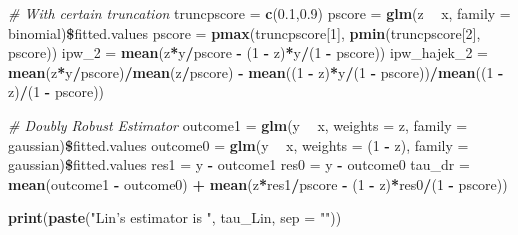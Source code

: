\documentclass[]{article}
\newenvironment{Shaded}{\begin{snugshade}}{\end{snugshade}}
\newcommand{\KeywordTok}[1]{\textcolor[rgb]{0.13,0.29,0.53}{\textbf{#1}}}
\newcommand{\DataTypeTok}[1]{\textcolor[rgb]{0.13,0.29,0.53}{#1}}
\newcommand{\DecValTok}[1]{\textcolor[rgb]{0.00,0.00,0.81}{#1}}
\newcommand{\FloatTok}[1]{\textcolor[rgb]{0.00,0.00,0.81}{#1}}
\newcommand{\StringTok}[1]{\textcolor[rgb]{0.31,0.60,0.02}{#1}}
\newcommand{\CommentTok}[1]{\textcolor[rgb]{0.56,0.35,0.01}{\textit{#1}}}
\newcommand{\OperatorTok}[1]{\textcolor[rgb]{0.81,0.36,0.00}{\textbf{#1}}}
\newcommand{\NormalTok}[1]{#1}
\begin{document}
\begin{Shaded}
\begin{Highlighting}[]
\CommentTok{# With certain truncation}
\NormalTok{truncpscore =}\StringTok{ }\KeywordTok{c}\NormalTok{(}\FloatTok{0.1}\NormalTok{,}\FloatTok{0.9}\NormalTok{)}
\NormalTok{pscore =}\StringTok{ }\KeywordTok{glm}\NormalTok{(z }\OperatorTok{~}\StringTok{ }\NormalTok{x, }\DataTypeTok{family =}\NormalTok{ binomial)}\OperatorTok{\$}\NormalTok{fitted.values}
\NormalTok{pscore =}\StringTok{ }\KeywordTok{pmax}\NormalTok{(truncpscore[}\DecValTok{1}\NormalTok{], }\KeywordTok{pmin}\NormalTok{(truncpscore[}\DecValTok{2}\NormalTok{], pscore))}
\NormalTok{ipw_}\DecValTok{2}\NormalTok{ =}\StringTok{ }\KeywordTok{mean}\NormalTok{(z}\OperatorTok{*}\NormalTok{y}\OperatorTok{/}\NormalTok{pscore }\OperatorTok{-}\StringTok{ }\NormalTok{(}\DecValTok{1} \OperatorTok{-}\StringTok{ }\NormalTok{z)}\OperatorTok{*}\NormalTok{y}\OperatorTok{/}\NormalTok{(}\DecValTok{1} \OperatorTok{-}\StringTok{ }\NormalTok{pscore))}
\NormalTok{ipw_hajek_}\DecValTok{2}\NormalTok{ =}\StringTok{ }\KeywordTok{mean}\NormalTok{(z}\OperatorTok{*}\NormalTok{y}\OperatorTok{/}\NormalTok{pscore)}\OperatorTok{/}\KeywordTok{mean}\NormalTok{(z}\OperatorTok{/}\NormalTok{pscore) }\OperatorTok{-}\StringTok{ }\KeywordTok{mean}\NormalTok{((}\DecValTok{1} \OperatorTok{-}\StringTok{ }\NormalTok{z)}\OperatorTok{*}\NormalTok{y}\OperatorTok{/}\NormalTok{(}\DecValTok{1} \OperatorTok{-}\StringTok{ }\NormalTok{pscore))}\OperatorTok{/}\KeywordTok{mean}\NormalTok{((}\DecValTok{1} \OperatorTok{-}\StringTok{ }\NormalTok{z)}\OperatorTok{/}\NormalTok{(}\DecValTok{1} \OperatorTok{-}\StringTok{ }\NormalTok{pscore))}

\CommentTok{# Doubly Robust Estimator}
\NormalTok{outcome1 =}\StringTok{ }\KeywordTok{glm}\NormalTok{(y }\OperatorTok{~}\StringTok{ }\NormalTok{x, }\DataTypeTok{weights =}\NormalTok{ z, }\DataTypeTok{family =}\NormalTok{ gaussian)}\OperatorTok{\$}\NormalTok{fitted.values}
\NormalTok{outcome0 =}\StringTok{ }\KeywordTok{glm}\NormalTok{(y }\OperatorTok{~}\StringTok{ }\NormalTok{x, }\DataTypeTok{weights =}\NormalTok{ (}\DecValTok{1} \OperatorTok{-}\StringTok{ }\NormalTok{z), }\DataTypeTok{family =}\NormalTok{ gaussian)}\OperatorTok{\$}\NormalTok{fitted.values}
\NormalTok{res1 =}\StringTok{ }\NormalTok{y }\OperatorTok{-}\StringTok{ }\NormalTok{outcome1}
\NormalTok{res0 =}\StringTok{ }\NormalTok{y }\OperatorTok{-}\StringTok{ }\NormalTok{outcome0}
\NormalTok{tau_dr =}\StringTok{ }\KeywordTok{mean}\NormalTok{(outcome1 }\OperatorTok{-}\StringTok{ }\NormalTok{outcome0) }\OperatorTok{+}\StringTok{ }\KeywordTok{mean}\NormalTok{(z}\OperatorTok{*}\NormalTok{res1}\OperatorTok{/}\NormalTok{pscore }\OperatorTok{-}\StringTok{ }\NormalTok{(}\DecValTok{1} \OperatorTok{-}\StringTok{ }\NormalTok{z)}\OperatorTok{*}\NormalTok{res0}\OperatorTok{/}\NormalTok{(}\DecValTok{1} \OperatorTok{-}\StringTok{ }\NormalTok{pscore))}

\KeywordTok{print}\NormalTok{(}\KeywordTok{paste}\NormalTok{(}\StringTok{"Lin's estimator is "}\NormalTok{, tau_Lin, }\DataTypeTok{sep =} \StringTok{""}\NormalTok{))}
\end{Highlighting}
\end{Shaded}
\end{document}

